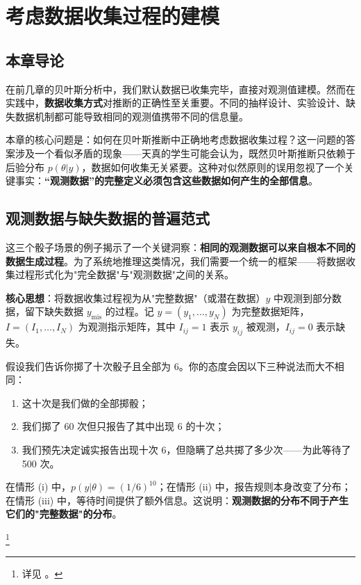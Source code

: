 
\chapter{考虑数据收集过程的建模}

\section{本章导论}

在前几章的贝叶斯分析中，我们默认数据已收集完毕，直接对观测值建模。然而在实践中，\textbf{数据收集方式}对推断的正确性至关重要。不同的抽样设计、实验设计、缺失数据机制都可能导致相同的观测值携带不同的信息量。

本章的核心问题是：如何在贝叶斯推断中正确地考虑数据收集过程？这一问题的答案涉及一个看似矛盾的现象——天真的学生可能会认为，既然贝叶斯推断只依赖于后验分布 $p(\theta|y)$，数据如何收集无关紧要。这种对似然原则的误用忽视了一个关键事实：\textbf{``观测数据''的完整定义必须包含这些数据如何产生的全部信息}。

\section{观测数据与缺失数据的普遍范式}

这三个骰子场景的例子揭示了一个关键洞察：\textbf{相同的观测数据可以来自根本不同的数据生成过程}。为了系统地推理这类情况，我们需要一个统一的框架——将数据收集过程形式化为"完全数据"与"观测数据"之间的关系。

\textbf{核心思想}：将数据收集过程视为从"完整数据"（或潜在数据）$y$ 中观测到部分数据，留下缺失数据 $y_{\mathrm{mis}}$ 的过程。记 $y = (y_1, \ldots, y_N)$ 为完整数据矩阵，$I = (I_1, \ldots, I_N)$ 为观测指示矩阵，其中 $I_{ij} = 1$ 表示 $y_{ij}$ 被观测，$I_{ij} = 0$ 表示缺失。

\begin{Example}[骰子实验]
  假设我们告诉你掷了十次骰子且全部为 6。你的态度会因以下三种说法而大不相同：
  \begin{enumerate}
    \item 这十次是我们做的全部掷骰；
    \item 我们掷了 60 次但只报告了其中出现 6 的十次；
    \item 我们预先决定诚实报告出现十次 6，但隐瞒了总共掷了多少次——为此等待了 500 次。
  \end{enumerate}
  在情形 (i) 中，$p(y|\theta) = (1/6)^{10}$；在情形 (ii) 中，报告规则本身改变了分布；在情形 (iii) 中，等待时间提供了额外信息。这说明：\textbf{观测数据的分布不同于产生它们的"完整数据"的分布}。
\end{Example}\footnote{详见 \cite[ Chapter 8]{gelman2013bayesian}。}

